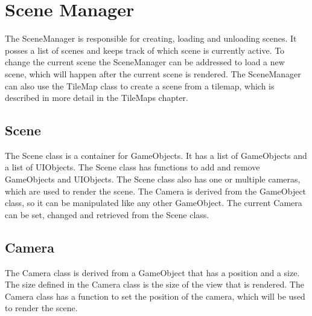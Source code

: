 \section{Scene Manager}
\label{sec:sceneManager}
The SceneManager is responsible for creating, loading and unloading scenes.
It posses a list of scenes and keeps track of which scene is currently active.
To change the current scene the SceneManager can be addressed to load a new scene, which will happen after the current scene is rendered.
The SceneManager can also use the TileMap class to create a scene from a tilemap, which is described in more detail in the TileMaps chapter.

\subsection{Scene}
The Scene class is a container for GameObjects.
It has a list of GameObjects and a list of UIObjects.
The Scene class has functions to add and remove GameObjects and UIObjects.
The Scene class also has one or multiple cameras, which are used to render the scene.
The Camera is derived from the GameObject class, so it can be manipulated like any other GameObject.
The current Camera can be set, changed and retrieved from the Scene class.

\subsection{Camera}
The Camera class is derived from a GameObject that has a position and a size.
The size defined in the Camera class is the size of the view that is rendered.
The Camera class has a function to set the position of the camera, which will be used to render the scene.
